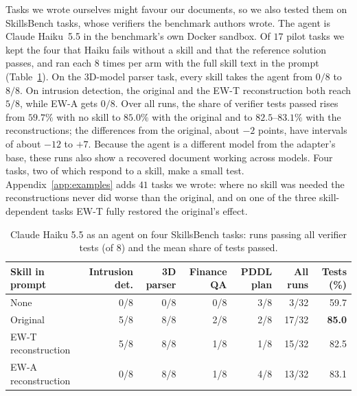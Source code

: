 \documentclass[11pt]{article}
\newcommand{\best}[1]{\textbf{#1}}
\newcommand{\EWT}{\textsc{EW-T}}
\newcommand{\EWA}{\textsc{EW-A}}
\begin{document}
Tasks we wrote ourselves might favour our documents, so we also tested them on SkillsBench tasks, whose verifiers the benchmark authors wrote.
The agent is Claude Haiku~5.5 in the benchmark's own Docker sandbox. Of $17$ pilot tasks we kept the four that Haiku fails without a skill and
that the reference solution passes, and ran each $8$ times per arm with the full skill text in the prompt (Table~\ref{tab:agent}). On the 3D-model
parser task, every skill takes the agent from $0/8$ to $8/8$. On intrusion detection, the original and the \EWT{} reconstruction both reach $5/8$,
while \EWA{} gets $0/8$. Over all runs, the share of verifier tests passed rises from $59.7\%$ with no skill to $85.0\%$ with the original and to
$82.5$--$83.1\%$ with the reconstructions; the differences from the original, about $-2$ points, have intervals of about $-12$ to $+7$. Because the
agent is a different model from the adapter's base, these runs also show a recovered document working across models. Four tasks, two of which
respond to a skill, make a small test. Appendix~\ref{app:examples} adds $41$ tasks we wrote: where no skill was needed the reconstructions never
did worse than the original, and on one of the three skill-dependent tasks \EWT{} fully restored the original's effect.

\begin{table}[!htb]
\centering
\caption{Claude Haiku 5.5 as an agent on four SkillsBench tasks: runs passing all verifier tests (of $8$) and the mean share of tests passed.}
\label{tab:agent}
\small
\setlength{\tabcolsep}{5pt}
\begin{tabular}{lrrrrrr}
\toprule
Skill in prompt & Intrusion det. & 3D parser & Finance QA & PDDL plan & All runs & Tests (\%)\\
\midrule
None & 0/8 & 0/8 & 0/8 & 3/8 & 3/32 & 59.7\\
Original & 5/8 & 8/8 & 2/8 & 2/8 & 17/32 & \best{85.0}\\
\EWT{} reconstruction & 5/8 & 8/8 & 1/8 & 1/8 & 15/32 & 82.5\\
\EWA{} reconstruction & 0/8 & 8/8 & 1/8 & 4/8 & 13/32 & 83.1\\
\bottomrule
\end{tabular}
\end{table}
\end{document}
